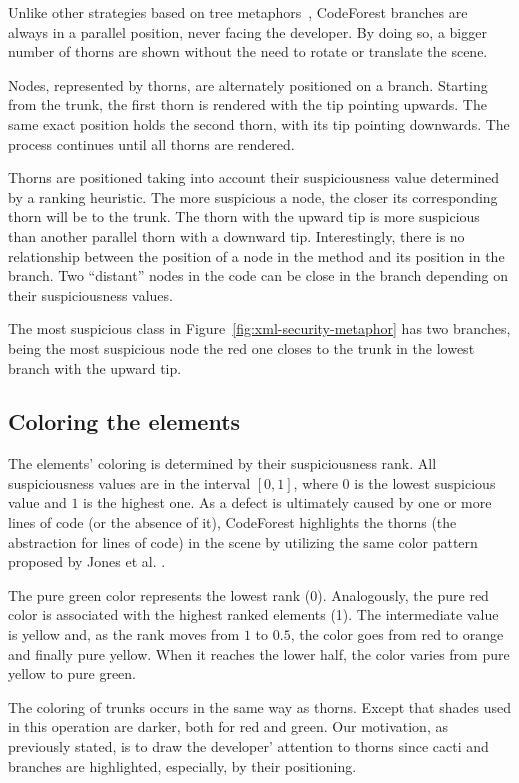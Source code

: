 Unlike other strategies based on tree metaphors~\cite{erra2012towards},
CodeForest branches are always in a parallel position, never facing the
developer. By doing so, a bigger number of thorns are shown without the need to
rotate or translate the scene.

Nodes, represented by thorns, are alternately positioned on a branch. Starting
from the trunk, the first thorn is rendered with the tip pointing upwards. The
same exact position holds the second thorn, with its tip pointing downwards. The
process continues until all thorns are rendered.

Thorns are positioned taking into account their suspiciousness value determined
by a ranking heuristic.  The more suspicious a node, the  closer  its
corresponding thorn will be to the trunk. The thorn with the upward tip is more
suspicious than another parallel thorn with a downward tip. Interestingly, there
is no relationship between the position of a node in the method and its position
in the branch. Two ``distant'' nodes in the code can be close in the branch
depending on their suspiciousness values.

The most suspicious class in Figure~\ref{fig:xml-security-metaphor} has two
branches, being the most suspicious node the red one closes to the trunk in the
lowest branch with the upward tip.

\subsection{Coloring the elements}
\label{subsec:coloring}
The elements' coloring is determined by their suspiciousness rank.  All
suspiciousness values are in the interval $[0,1]$, where $0$ is the lowest
suspicious value and $1$ is the highest one. As a defect is ultimately caused by
one or more lines of code (or the absence of it), CodeForest highlights the
thorns (the abstraction for lines of code) in the scene by utilizing the same
color pattern proposed by Jones et al. \cite{jones2002visualization}.

The pure green color represents the lowest rank (0). Analogously, the pure red
color is associated with the highest ranked elements (1). The intermediate value
is yellow and, as the rank moves from $1$ to $0.5$, the color goes from red to
orange and finally pure yellow. When it reaches the lower half, the color varies
from pure yellow to pure green.

The coloring of trunks occurs in the same way as thorns. Except that shades used
in this operation are darker, both for red and green. Our motivation, as
previously stated, is to draw the developer' attention to thorns since cacti and
branches are highlighted, especially, by their positioning.

